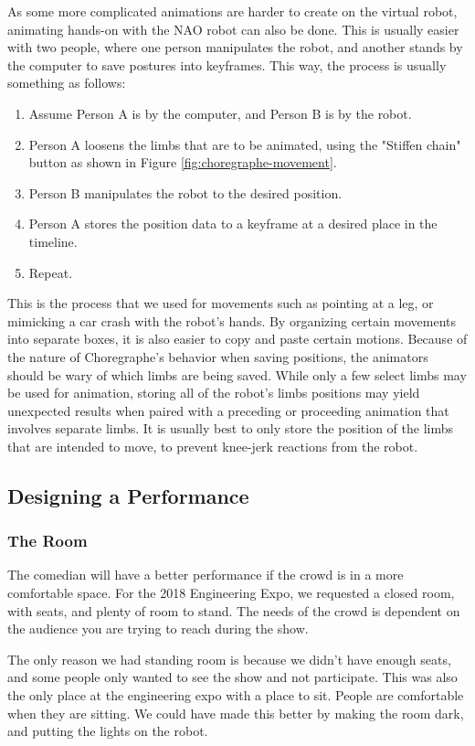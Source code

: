 As some more complicated animations are harder to create on the virtual robot, animating hands-on with the NAO robot can also be done. This is usually easier with two people, where one person manipulates the robot, and another stands by the computer to save postures into keyframes. This way, the process is usually something as follows:
\begin{enumerate}
	\item {Assume Person A is by the computer, and Person B is by the robot.}
	\item {Person A loosens the limbs that are to be animated, using the "Stiffen chain" button as shown in Figure \ref{fig:choregraphe-movement}.}
	\item{Person B manipulates the robot to the desired position.}
	\item{Person A stores the position data to a keyframe at a desired place in the timeline.}
	\item{Repeat.}
\end{enumerate}
This is the process that we used for movements such as pointing at a leg, or mimicking a car crash with the robot's hands.
By organizing certain movements into separate boxes, it is also easier to copy and paste certain motions.
Because of the nature of Choregraphe's behavior when saving positions, the animators should be wary of which limbs are being saved.
While only a few select limbs may be used for animation, storing all of the robot's limbs positions may yield unexpected results when paired with a preceding or proceeding animation that involves separate limbs. It is usually best to only store the position of the limbs that are intended to move, to prevent knee-jerk reactions from the robot.



\subsection{Designing a Performance}

    \subsubsection{The Room}
    The comedian will have a better performance if the crowd is in a more comfortable space.
    For the 2018 Engineering Expo, we requested a closed room, with seats, and plenty of room to stand.
    The needs of the crowd is dependent on the audience you are trying to reach during the show.


    The only reason we had standing room is because we didn't have enough seats, and some people only wanted to see the show and not participate.
    This was also the only place at the engineering expo with a place to sit.
    People are comfortable when they are sitting.
    We could have made this better by making the room dark, and putting the lights on the robot.
